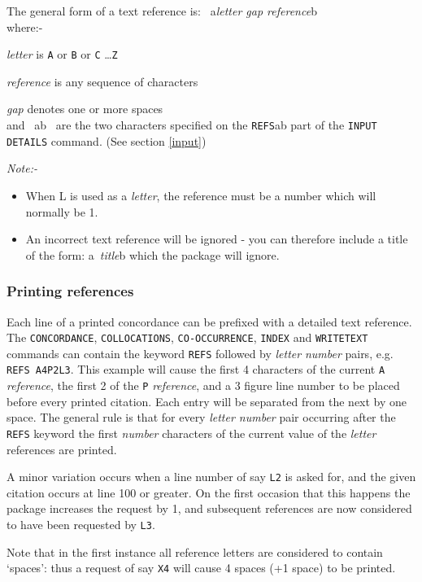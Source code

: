 The general form of a text reference is: ~a{\em letter gap reference}b\\
where:-

{\em letter} is \verb/A/ or \verb/B/ or \verb/C/ \ldots \verb/Z/

{\em reference} is any sequence of characters

{\em gap} denotes one or more spaces\\
and ~ab~ are the two characters specified on the \verb/REFS/ab part of the
\verb/INPUT DETAILS/ command.  (See section \ref{input})

{\em Note:-}
\begin{itemize}
\item When L is used as a {\em letter}, the reference must be a number
      which will normally be 1.
\item An incorrect text reference will be ignored - you can therefore
      include a title of the form: a~{\em title}b which the package will
      ignore.
\end{itemize}

\subsubsection{Printing references}
Each line of a printed concordance can be prefixed with a
detailed text reference.  The \verb/CONCORDANCE/, \verb/COLLOCATIONS/,
\verb/CO-OCCURRENCE/, \verb/INDEX/ and \verb/WRITETEXT/
commands can contain the keyword \verb/REFS/ followed by {\em letter}
{\em number} pairs, e.g. \verb/REFS A4P2L3/.  This example will cause the
first 4 characters of the current \verb/A/ {\em reference}, the first 2
of the \verb/P/ {\em reference}, and a 3 figure line number to be placed
before every printed citation.  Each entry will be separated
from the next by one space.  The general rule is that for
every {\em letter number} pair occurring after the \verb/REFS/ keyword
the first {\em number}
characters of the current value of the {\em letter} references are
printed.

A minor variation occurs when a line number of say \verb/L2/ is asked
for, and the given citation occurs at line 100 or greater. On
the first occasion that this happens the package increases the
request by 1, and subsequent references are now considered to
have been requested by \verb/L3/.

Note that in the first instance all reference letters are
considered to contain `spaces': thus a request of say \verb/X4/ will
cause 4 spaces (+1 space) to be printed.

